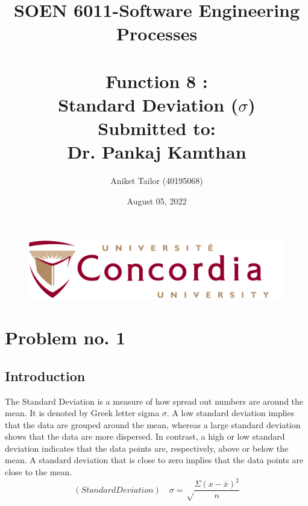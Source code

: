 \documentclass[12pt,a4paper]{report}
\begin{document}
\begin{figure}
    \centering
    \begin{center}
    \includegraphics[width=1.0\linewidth]{Images/cu_logo2.png}    
    \end{center}
    \label{fig:Concordia University Logo.}
\end{figure}

\title{SOEN 6011-Software Engineering Processes\\[3.0em] 

 \\
\textbf{Function 8 :\\  Standard Deviation ($\sigma$) } \\[2.5em] Submitted to:\\ Dr. Pankaj Kamthan}

\author{Aniket Tailor (40195068) }
\date{August 05, 2022}


\maketitle


\chapter{Problem no. 1}

\section*{Introduction}
The Standard Deviation is a measure of how spread out numbers are around the mean. It is denoted by Greek letter sigma $\sigma$. A low standard deviation implies that the data are grouped around the mean, whereas a large standard deviation shows that the data are more dispersed. In contrast, a high or low standard deviation indicates that the data points are, respectively, above or below the mean. A standard deviation that is close to zero implies that the data points are close to the mean.\\
\begin{equation*}
   (Standard Deviation) \quad \sigma = \sqrt\frac{{\Sigma (x- \overline{x})^2}}{n}
  \end{equation*}
  
\end{document}
